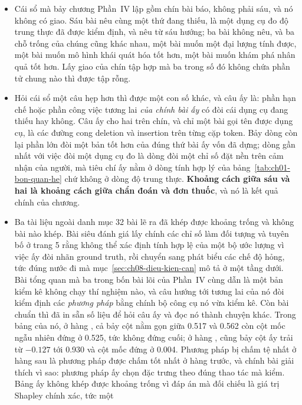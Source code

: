 \begin{tomtat}
\begin{itemize}
  \item Cái sổ mà bảy chương Phần~IV lập gồm chín bài báo, không phải sáu, và nó
không có giao. Sáu bài nêu cùng một thứ đang thiếu, là một dụng cụ đo độ trung
thực đã được kiểm định, và nêu từ sáu hướng; ba bài không nêu, và ba chỗ trống
của chúng cũng khác nhau, một bài muốn một đại lượng tính được, một bài muốn mô
hình khái quát hóa tốt hơn, một bài muốn khám phá nhân quả tốt hơn. Lấy giao của
chín tập hợp mà ba trong số đó không chứa phần tử chung nào thì được tập rỗng.
  \item Hỏi cái sổ một câu hẹp hơn thì được một con số khác, và câu ấy là: phần
hạn chế hoặc phần công việc tương lai \emph{của chính bài ấy} có đòi cái dụng cụ
đang thiếu hay không. Câu ấy cho hai trên chín, và chỉ một bài gọi tên được dụng
cụ, là các đường cong deletion và insertion trên từng cặp token. Bảy dòng còn lại
phần lớn đòi một bản tốt hơn của đúng thứ bài ấy vốn đã dựng; dòng gần nhất với
việc đòi một dụng cụ đo là dòng đòi một chỉ số đặt nền trên cảm nhận của người,
mà tiêu chí ấy nằm ở dòng tính hợp lý của bảng~\ref{tab:ch01-bon-quan-he} chứ
không ở dòng độ trung thực. \textbf{Khoảng cách giữa sáu và hai là khoảng cách
giữa chẩn đoán và đơn thuốc}, và nó là kết quả chính của chương.
  \item Ba tài liệu ngoài danh mục 32 bài lẽ ra đã khép được khoảng trống và
không bài nào khép. Bài siêu đánh giá lấy chính các chỉ số làm đối tượng và
tuyên bố ở trang 5 rằng không thể xác định tính hợp lệ của một bộ ước lượng vì
việc ấy đòi nhãn ground truth, rồi chuyển sang phát biểu các chế độ hỏng, tức
đúng nước đi mà mục~\ref{sec:ch08-dieu-kien-can} mô tả ở một tầng dưới. Bài tổng
quan mà ba trong bốn bài lõi của Phần~IV cùng dẫn là một bản kiểm kê không chạy
thí nghiệm nào, và câu hướng tới tương lai của nó đòi kiểm định các
\emph{phương pháp} bằng chính bộ công cụ nó vừa kiểm kê. Còn bài chuẩn thì đã in
sẵn số liệu để hỏi câu ấy và đọc nó thành chuyện khác. Trong bảng của nó, ở hàng , cả bảy cột nằm gọn giữa
0.517 và 0.562 còn cột mốc ngẫu nhiên đứng ở 0.525, tức không đứng cuối; ở hàng
, cũng bảy cột ấy trải từ $-0.127$ tới 0.930 và cột mốc đứng ở
0.004. Phương pháp bị chấm tệ nhất ở hàng sau là phương pháp được chấm tốt nhất ở
hàng trước, và chính bài giải thích vì sao: phương pháp ấy chọn đặc trưng theo
đúng thao tác mà  kiểm. Bảng ấy không khép được khoảng trống
vì đáp án mà  đối chiếu là giá trị Shapley chính xác, tức một

\end{itemize}
\end{tomtat}
